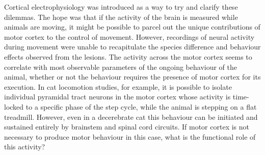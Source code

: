Cortical electrophysiology was introduced as a way to try and clarify these dilemmas. The hope was that if the activity of the brain is measured while animals are moving, it might be possible to parcel out the unique contributions of motor cortex to the control of movement. However, recordings of neural activity during movement were unable to recapitulate the species difference and behaviour effects observed from the lesions. The activity across the motor cortex seems to correlate with most observable parameters of the ongoing behaviour of the animal, whether or not the behaviour requires the presence of motor cortex for its execution. In cat locomotion studies, for example, it is possible to isolate individual pyramidal tract neurons in the motor cortex whose activity is time-locked to a specific phase of the step cycle, while the animal is stepping on a flat treadmill. However, even in a decerebrate cat this behaviour can be initiated and sustained entirely by brainstem and spinal cord circuits. If motor cortex is not necessary to produce motor behaviour in this case, what is the functional role of this activity?